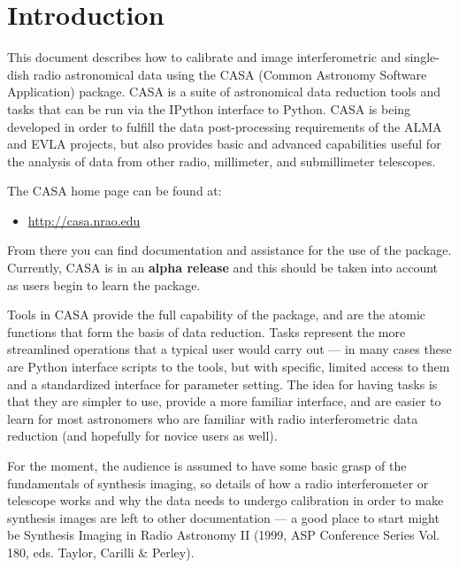 

\chapter{Introduction}
\label{chapter:intro}


This document describes how to calibrate and image interferometric and
single-dish radio astronomical data using the CASA (Common Astronomy
Software Application) package.  CASA is a suite of
astronomical data reduction tools and tasks that can be run via the
IPython interface to Python.  CASA is being developed in order to 
fulfill the data post-processing requirements of the ALMA and EVLA
projects, but also provides basic and advanced capabilities useful for
the analysis of data from other radio, millimeter, and submillimeter
telescopes.

The CASA home page can be found at:
\begin{itemize}
  \item \url{http://casa.nrao.edu}
\end{itemize}
From there you can find documentation and assistance for the use
of the package.
Currently, CASA is in an {\bf alpha release}
and this should be taken into account as users begin to learn the
package.

Tools in CASA provide the full capability of the package, and are the
atomic functions that form the basis of data reduction.  Tasks
represent the more streamlined operations that a typical user would
carry out --- in many cases these are Python interface scripts to the
tools, but with specific, limited access to them and a standardized
interface for parameter setting.  The idea for having tasks is that
they are simpler to use, provide a more familiar interface, and are
easier to learn for most astronomers who are familiar with radio
interferometric data reduction (and hopefully for novice users as well).

For the moment, the audience is assumed to have some basic grasp of
the fundamentals of synthesis imaging, so details of how a radio
interferometer or telescope works and why the data needs to undergo
calibration in order to make synthesis images are left to other
documentation --- a good place to start might be Synthesis Imaging in
Radio Astronomy II (1999, ASP Conference Series Vol. 180, eds. Taylor,
Carilli \& Perley).

